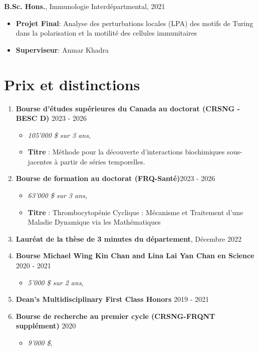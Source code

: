 \documentclass{article}
\newcommand{\cvsection}[1]{\section*{\rmfamily#1}}
\begin{document}
\hspace{1em} \textbf{B.Sc. Hons.}, Immunologie Interdépartmental, \hfill 2021
\begin{itemize}[leftmargin=4em, itemsep=0pt]
    \item[] \textbf{Projet Final}: Analyse des perturbations locales (LPA) des motifs de Turing dans la polarisation et la motilité des cellules immunitaires
    \item[] \textbf{Superviseur}: Anmar Khadra
\end{itemize}



\cvsection{Prix et distinctions}
\indent
\begin{enumerate}
    \item \textbf{Bourse d’études supérieures du Canada au doctorat (CRSNG - BESC D) }\hfill 2023 - 2026
    \begin{itemize}[leftmargin=1em, itemsep=0pt]
        \item[] \textit{105'000 \$ sur 3 ans},
        \item[] \textbf{Titre} : Méthode pour la découverte d'interactions biochimiques sous-jacentes à partir de séries temporelles.
    \end{itemize}

    \item \textbf{Bourse de formation au doctorat (FRQ-Santé)}\hfill 2023 - 2026
    \begin{itemize}[leftmargin=1em,itemsep=0pt]
        \item[] \textit{63'000 \$ sur 3 ans},
        \item[] \textbf{Titre} : Thrombocytopénie Cyclique : Mécanisme et Traitement d'une Maladie Dynamique via les Mathématiques
    \end{itemize}

    \item \textbf{Lauréat de la thèse de 3 minutes du département}, \hfill Décembre 2022

    \item \textbf{Bourse Michael Wing Kin Chan and Lina Lai Yan Chan en Science }\hfill 2020 - 2021
    \begin{itemize}[leftmargin=1em,itemsep=0pt]
        \item[] \textit{5'000 \$ sur 2 ans},
    \end{itemize}

    \item \textbf{Dean's Multidisciplinary First Class Honors} \hfill 2019 - 2021

    \item \textbf{Bourse de recherche au premier cycle (CRSNG-FRQNT supplément)} \hfill 2020
    \begin{itemize}[leftmargin=1em,itemsep=0pt]
        \item[] \textit{9'000 \$},
    \end{itemize}
\end{enumerate}
\end{document}

